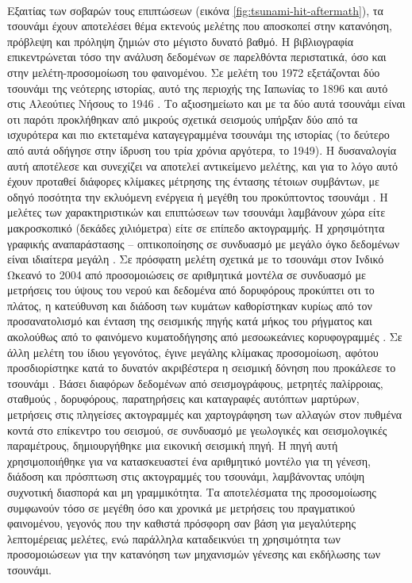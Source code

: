 \paragraph{} Εξαιτίας των σοβαρών τους επιπτώσεων (εικόνα
\ref{fig:tsunami-hit-aftermath}), τα τσουνάμι έχουν αποτελέσει θέμα εκτενούς μελέτης που
αποσκοπεί στην κατανόηση, πρόβλεψη και πρόληψη ζημιών στο μέγιστο δυνατό βαθμό. Η
βιβλιογραφία επικεντρώνεται τόσο την ανάλυση δεδομένων σε παρελθόντα περιστατικά, όσο και
στην μελέτη-προσομοίωση του φαινομένου. Σε μελέτη του 1972 εξετάζονται δύο τσουνάμι της
νεότερης ιστορίας, αυτό της περιοχής  της Ιαπωνίας το 1896 και αυτό στις
Αλεούτιες Νήσους το 1946 \cite{Kanamori1972346}. Το αξιοσημείωτο και με τα δύο αυτά
τσουνάμι είναι οτι παρότι προκλήθηκαν από μικρούς σχετικά σεισμούς υπήρξαν δύο από τα
ισχυρότερα και πιο εκτεταμένα καταγεγραμμένα τσουνάμι της ιστορίας (το δεύτερο από αυτά
οδήγησε στην ίδρυση του  τρία χρόνια αργότερα, το 1949). Η δυσαναλογία αυτή
αποτέλεσε και συνεχίζει να αποτελεί αντικείμενο μελέτης, και για το λόγο αυτό έχουν
προταθεί διάφορες κλίμακες μέτρησης της έντασης τέτοιων συμβάντων, με οδηγό ποσότητα την
εκλυόμενη ενέργεια \cite{Kanamori1977} ή μεγέθη του προκύπτοντος τσουνάμι
\cite{ABE19791561}. Η μελέτες των χαρακτηριστικών και επιπτώσεων των τσουνάμι λαμβάνουν
χώρα είτε μακροσκοπικό (δεκάδες χιλιόμετρα) είτε σε επίπεδο ακτογραμμής. Η χρησιμότητα
γραφικής αναπαράστασης -- οπτικοποίησης σε συνδυασμό με μεγάλο όγκο δεδομένων είναι
ιδιαίτερα μεγάλη \cite{Shuto1991171}. Σε πρόσφατη μελέτη σχετικά με το τσουνάμι στον
Ινδικό Ωκεανό το 2004 από προσομοιώσεις σε αριθμητικά μοντέλα σε συνδυασμό με μετρήσεις
του ύψους του νερού και δεδομένα από δορυφόρους προκύπτει οτι το πλάτος, η κατεύθυνση και
διάδοση των κυμάτων καθορίστηκαν κυρίως από τον προσανατολισμό και ένταση της σεισμικής
πηγής κατά μήκος του ρήγματος και ακολούθως από το φαινόμενο κυματοδήγησης από
μεσοωκεάνιες κορυφογραμμές \cite{Titov23092005}. Σε άλλη μελέτη του ίδιου γεγονότος, έγινε
μεγάλης κλίμακας προσομοίωση, αφότου προσδιορίστηκε κατά το δυνατόν ακριβέστερα η σεισμική
δόνηση που προκάλεσε το τσουνάμι \cite{Grilli2007414}. Βάσει διαφόρων δεδομένων από
σεισμογράφους, μετρητές παλίρροιας, σταθμούς , δορυφόρους, παρατηρήσεις και
καταγραφές αυτόπτων μαρτύρων, μετρήσεις στις πληγείσες ακτογραμμές και χαρτογράφηση των
αλλαγών στον πυθμένα κοντά στο επίκεντρο του σεισμού, σε συνδυασμό με γεωλογικές και
σεισμολογικές παραμέτρους, δημιουργήθηκε μια εικονική σεισμική πηγή. Η πηγή αυτή
χρησιμοποιήθηκε για να κατασκευαστεί ένα αριθμητικό μοντέλο για τη γένεση, διάδοση και
πρόσπτωση στις ακτογραμμές του τσουνάμι, λαμβάνοντας υπόψη συχνοτική διασπορά και μη
γραμμικότητα. Τα αποτελέσματα της προσομοίωσης συμφωνούν τόσο σε μεγέθη όσο και χρονικά με
μετρήσεις του πραγματικού φαινομένου, γεγονός που την καθιστά πρόσφορη σαν βάση για
μεγαλύτερης λεπτομέρειας μελέτες, ενώ παράλληλα καταδεικνύει τη χρησιμότητα των
προσομοιώσεων για την κατανόηση των μηχανισμών γένεσης και εκδήλωσης των τσουνάμι.

